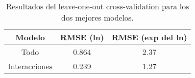 \begin{table}[H!]
\centering
\caption{Resultados del leave-one-out cross-validation para los dos mejores modelos.} 
\label{Tab:loocv}
\begin{tabular}{ccc}
  \hline
Modelo & RMSE (ln) & RMSE (exp del ln) \\ 
  \hline
Todo & 0.864 & 2.37 \\ 
  Interacciones & 0.239 & 1.27 \\ 
   \hline
\end{tabular}
\end{table}
